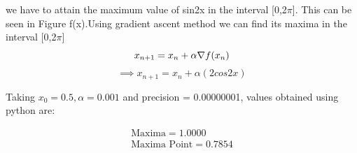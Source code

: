 \documentclass[journal,10pt,twocolumn]{article}
\begin{document}
we have to attain the maximum value of sin2x in the interval [0,2$\pi$]. This can be seen in Figure f(x).Using gradient ascent method we can find its maxima in the interval [0,2$\pi$]
\begin{equation}
        x_{n+1} = x_n + \alpha \nabla f(x_n) \\
\end{equation}
\vspace{1mm}
\begin{equation}
\implies x_{n+1}=x_n+\alpha(2cos2x)
\end{equation}

Taking $x_0=0.5,\alpha=0.001$ and precision = 0.00000001, values obtained using python are:
    

    \begin{align}
        \boxed{\text{Maxima} = 1.0000}\\
        \boxed{\text{Maxima Point} = 0.7854}
    \end{align}
   
    

    





 
\end{document}
